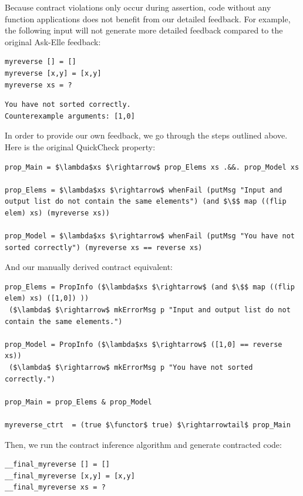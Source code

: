 \documentclass[10pt]{report}
\makeatletter
\newcommand{\functor}{<\!\!\!@\!\!\!>}
\makeatother
\begin{document}
{Because contract violations only occur during assertion, code without any function applications does not benefit from our detailed feedback.
For example, the following input will not generate more detailed feedback compared to the original Ask-Elle feedback:

\begin{lstlisting}[caption=Student input 1]
myreverse [] = []
myreverse [x,y] = [x,y]
myreverse xs = ?
\end{lstlisting}

\begin{lstlisting}[caption=Ask-Elle's response to input 1]
You have not sorted correctly.
Counterexample arguments: [1,0]
\end{lstlisting}

In order to provide our own feedback, we go through the steps outlined above.
Here is the original QuickCheck property:

\begin{lstlisting}[mathescape]
prop_Main = $\lambda$xs $\rightarrow$ prop_Elems xs .&&. prop_Model xs

prop_Elems = $\lambda$xs $\rightarrow$ whenFail (putMsg "Input and output list do not contain the same elements") (and $\$$ map ((flip elem) xs) (myreverse xs))

prop_Model = $\lambda$xs $\rightarrow$ whenFail (putMsg "You have not sorted correctly") (myreverse xs == reverse xs)
\end{lstlisting}

And our manually derived contract equivalent:

\begin{lstlisting}[mathescape]
prop_Elems = PropInfo ($\lambda$xs $\rightarrow$ (and $\$$ map ((flip elem) xs) ([1,0]) )) 
 ($\lambda$ $\rightarrow$ mkErrorMsg p "Input and output list do not contain the same elements.")
              
prop_Model = PropInfo ($\lambda$xs $\rightarrow$ ([1,0] == reverse xs)) 
 ($\lambda$ $\rightarrow$ mkErrorMsg p "You have not sorted correctly.")

prop_Main = prop_Elems & prop_Model

myreverse_ctrt  = (true $\functor$ true) $\rightarrowtail$ prop_Main
\end{lstlisting}

Then, we run the contract inference algorithm and generate contracted code:

\begin{lstlisting}[mathescape]
__final_myreverse [] = []
__final_myreverse [x,y] = [x,y]
__final_myreverse xs = ?


\end{lstlisting}}
\end{document}
